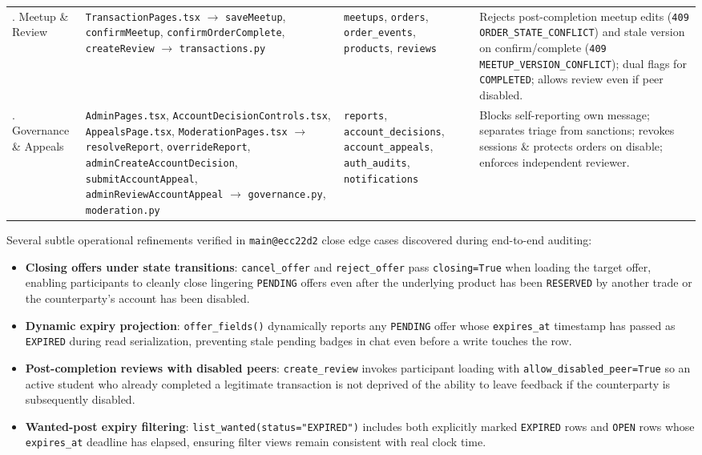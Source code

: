 \begin{table}[htbp]
\begin{tabularx}{\linewidth}{@{}>{\raggedright\arraybackslash}p{2.2cm}>{\raggedright\arraybackslash}p{4.7cm}>{\raggedright\arraybackslash}p{3.0cm}>{\raggedright\arraybackslash}X@{}}
    5. Meetup \& Review & \texttt{TransactionPages.tsx} $\to$ \texttt{saveMeetup}, \texttt{confirmMeetup}, \texttt{confirmOrder\allowbreak Complete}, \texttt{createReview} $\to$ \texttt{transactions.py} & \texttt{meetups}, \texttt{orders}, \texttt{order\_events}, \texttt{products}, \texttt{reviews} & Rejects post-completion meetup edits (\texttt{409 ORDER\_STATE\_CONFLICT}) and stale version on confirm/complete (\texttt{409 MEETUP\_VERSION\_CONFLICT}); dual flags for \texttt{COMPLETED}; allows review even if peer disabled. \\
    6. Governance \& Appeals & \texttt{AdminPages.tsx}, \texttt{AccountDecision\allowbreak Controls.tsx}, \texttt{AppealsPage.tsx}, \texttt{ModerationPages.tsx} $\to$ \texttt{resolveReport}, \texttt{overrideReport}, \texttt{adminCreate\allowbreak AccountDecision}, \texttt{submitAccount\allowbreak Appeal}, \texttt{adminReview\allowbreak AccountAppeal} $\to$ \texttt{governance.py}, \texttt{moderation.py} & \texttt{reports}, \texttt{account\_\allowbreak decisions}, \texttt{account\_\allowbreak appeals}, \texttt{auth\_audits}, \texttt{notifications} & Blocks self-reporting own message; separates triage from sanctions; revokes sessions \& protects orders on disable; enforces independent reviewer. \\
    \bottomrule
  \end{tabularx}
\end{table}

Several subtle operational refinements verified in \texttt{main@ecc22d2} close edge cases discovered during end-to-end auditing:
\begin{itemize}
  \item \textbf{Closing offers under state transitions}: \texttt{cancel\_offer} and \texttt{reject\_offer} pass \texttt{closing=True} when loading the target offer, enabling participants to cleanly close lingering \texttt{PENDING} offers even after the underlying product has been \texttt{RESERVED} by another trade or the counterparty's account has been disabled.
  \item \textbf{Dynamic expiry projection}: \texttt{offer\_fields()} dynamically reports any \texttt{PENDING} offer whose \texttt{expires\_at} timestamp has passed as \texttt{EXPIRED} during read serialization, preventing stale pending badges in chat even before a write touches the row.
  \item \textbf{Post-completion reviews with disabled peers}: \texttt{create\_review} invokes participant loading with \texttt{allow\_disabled\_peer=True} so an active student who already completed a legitimate transaction is not deprived of the ability to leave feedback if the counterparty is subsequently disabled.
  \item \textbf{Wanted-post expiry filtering}: \texttt{list\_wanted(status="EXPIRED")} includes both explicitly marked \texttt{EXPIRED} rows and \texttt{OPEN} rows whose \texttt{expires\_at} deadline has elapsed, ensuring filter views remain consistent with real clock time.
\end{itemize}

